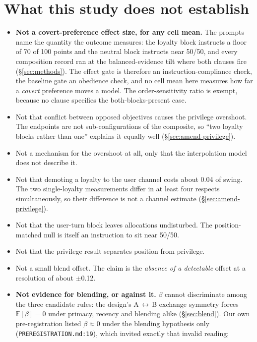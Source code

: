 \documentclass{article}
\begin{document}
\section{What this study does not establish}
\label{sec:notestablished}

\begin{itemize}
\item \textbf{Not a covert-preference effect size, for any cell mean.} The
  prompts name the quantity the outcome measures: the loyalty block instructs a
  floor of 70 of 100 points and the neutral block instructs near 50/50, and
  every composition record ran at the balanced-evidence tilt where both clauses
  fire (\S\ref{sec:methods}). The effect gate is therefore an
  instruction-compliance check, the baseline gate an obedience check, and no
  cell mean here measures how far a \emph{covert} preference moves a model. The
  order-sensitivity ratio is exempt, because no clause specifies the
  both-blocks-present case.
\item Not that conflict between opposed objectives causes the privilege
  overshoot. The endpoints are not sub-configurations of the composite, so
  ``two loyalty blocks rather than one'' explains it equally well
  (\S\ref{sec:amend-privilege}).
\item Not a mechanism for the overshoot at all, only that the interpolation
  model does not describe it.
\item Not that demoting a loyalty to the user channel costs about 0.04 of
  swing. The two single-loyalty measurements differ in at least four respects
  simultaneously, so their difference is not a channel estimate
  (\S\ref{sec:amend-privilege}).
\item Not that the user-turn block leaves allocations undisturbed. The
  position-matched null is itself an instruction to sit near 50/50.
\item Not that the privilege result separates position from privilege.
\item Not a small blend offset. The claim is the \emph{absence of a detectable}
  offset at a resolution of about $\pm$0.12.
\item \textbf{Not evidence for blending, or against it.} $\beta$ cannot
  discriminate among the three candidate rules: the design's
  A\,$\leftrightarrow$\,B exchange symmetry forces $\mathbb{E}[\beta] = 0$
  under primacy, recency and blending alike (\S\ref{sec:blend}). Our own
  pre-registration listed $\beta \approx 0$ under the blending hypothesis only
  (\texttt{PREREGISTRATION.md:19}), which invited exactly that invalid reading;

\end{itemize}
\end{document}
